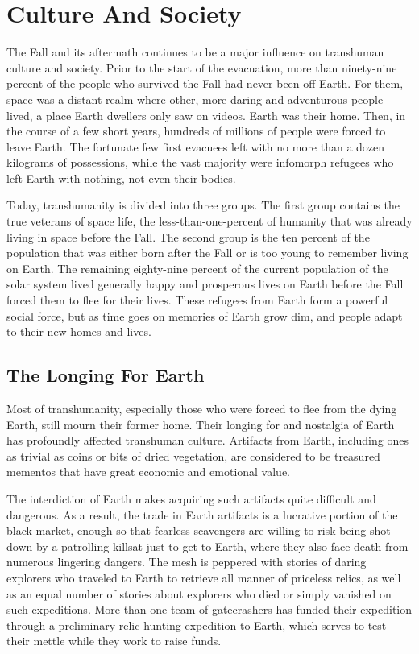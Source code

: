 \section{Culture And Society}

The Fall and its aftermath continues to be a major 
influence on transhuman culture and society. Prior 
to the start of the evacuation, more than ninety-nine 
percent of the people who survived the Fall had never 
been off Earth. For them, space was a distant realm 
where other, more daring and adventurous people 
lived, a place Earth dwellers only saw on videos. Earth 
was their home. Then, in the course of a few short 
years, hundreds of millions of people were forced to 
leave Earth. The fortunate few first evacuees left with 
no more than a dozen kilograms of possessions, while 
the vast majority were infomorph refugees who left 
Earth with nothing, not even their bodies.

Today, transhumanity is divided into three groups. 
The first group contains the true veterans of space 
life, the less-than-one-percent of humanity that was 
already living in space before the Fall. The second 
group is the ten percent of the population that was 
either born after the Fall or is too young to remember 
living on Earth. The remaining eighty-nine percent of 
the current population of the solar system lived generally
happy and prosperous lives on Earth before the
Fall forced them to flee for their lives. These refugees 
from Earth form a powerful social force, but as time 
goes on memories of Earth grow dim, and people 
adapt to their new homes and lives.

\subsection{The Longing For Earth}

Most of transhumanity, especially those who were 
forced to flee from the dying Earth, still mourn their 
former home. Their longing for and nostalgia of 
Earth has profoundly affected transhuman culture. 
Artifacts from Earth, including ones as trivial as 
coins or bits of dried vegetation, are considered to 
be treasured mementos that have great economic and 
emotional value.

The interdiction of Earth makes acquiring such 
artifacts quite difficult and dangerous. As a result, the 
trade in Earth artifacts is a lucrative portion of the 
black market, enough so that fearless scavengers are 
willing to risk being shot down by a patrolling killsat 
just to get to Earth, where they also face death from 
numerous lingering dangers. The mesh is peppered 
with stories of daring explorers who traveled to Earth 
to retrieve all manner of priceless relics, as well as 
an equal number of stories about explorers who died 
or simply vanished on such expeditions. More than 
one team of gatecrashers has funded their expedition
through a preliminary relic-hunting expedition
to Earth, which serves to test their mettle while they 
work to raise funds.

